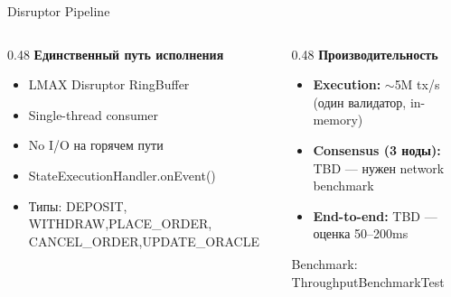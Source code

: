 \documentclass[aspectratio=169]{beamer}
\begin{document}
\begin{frame}{Disruptor Pipeline}

\begin{columns}[t]
\begin{column}{0.48\textwidth}
\textbf{Единственный путь исполнения}
\vspace{0.3em}
\nopagebreak
\begin{itemize}
    \item LMAX Disruptor RingBuffer
    \item Single-thread consumer
    \item No I/O на горячем пути
    \item StateExecutionHandler.onEvent()
    \item Типы: DEPOSIT, WITHDRAW,\newline PLACE\_ORDER, CANCEL\_ORDER,\newline UPDATE\_ORACLE
\end{itemize}
\end{column}
\begin{column}{0.48\textwidth}
\textbf{Производительность}
\vspace{0.3em}
\nopagebreak
\begin{itemize}
    \item[\textcolor{green}{\checkmark}] \textbf{Execution:} $\sim$5M tx/s (один валидатор, in-memory)
    \item[\textcolor{orange}{?}] \textbf{Consensus (3 ноды):} TBD --- нужен network benchmark
    \item[\textcolor{orange}{?}] \textbf{End-to-end:} TBD --- оценка 50--200ms
\end{itemize}
\vspace{1em}
\hfill{\small\color{gray} Benchmark: ThroughputBenchmarkTest}
\end{column}
\end{columns}
\end{frame}
\end{document}

